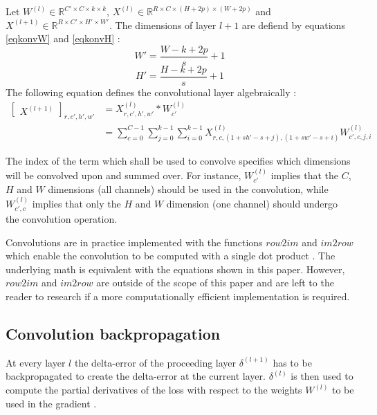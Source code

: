 \documentclass[a4paper, twoside]{article}
\begin{document}
Let $W^{(l)} \in \mathbb{R}^{C' \times C  \times k \times k}$, $X^{(l)} \in \mathbb{R}^{R \times C  \times (H+2p) \times (W+2p)}$ and $X^{(l+1)} \in \mathbb{R}^{R \times C'  \times H' \times W'}$. The dimensions of layer $l+1$ are defiend by equations \eqref{eqkonvW} and \eqref{eqkonvH} \cite{cs231n} \cite{convmath} \cite{convarithmetic}: 
\begin{equation}\label{eqkonvW}
W' = \frac{W-k+2p}{s} +1
\end{equation}
\begin{equation}\label{eqkonvH}
H' = \frac{H-k+2p}{s} +1
\end{equation}
The following equation defines the convolutional layer algebraically \cite{cs231n} \cite{convmath}:
\begin{equation}\label{konvolution}
\begin{split}
	\begin{bmatrix} X^{(l+1)} \end{bmatrix}_{r, c', h', w'}	
		& = X^{(l)}_{r, c', h', w'} *W^{(l)}_{c'} \\
		& = \sum^{C-1 }_{c=0} \sum^{k-1 }_{j=0} \sum^{k-1 }_{i=0} X^{(l)}_{r, c, (1+sh'-s+j), (1+sw'-s+i)}W^{(l)}_{c', c, j, i}
\end{split}
\end{equation}

The index of the term which shall be used to convolve specifies which dimensions will be convolved upon and summed over. For instance, $W^{(l)}_{c'}$ implies that the $C$, $H$ and $W$ dimensions (all channels) should be used in the convolution, while $W^{(l)}_{c', c}$ implies that only the $H$ and $W$ dimension (one channel) should undergo the convolution operation.

Convolutions are in practice implemented with the functions $row2im$ and $im2row$ which enable the convolution to be computed with a single dot product \cite{cs231n} \cite{convmath} \cite{convarithmetic}. The underlying math is equivalent with the equations shown in this paper. However, $row2im$ and $im2row$ are outside of the scope of this paper and are left to the reader to research if a more computationally efficient implementation is required. 

\subsection{Convolution backpropagation}
At every layer $l$ the delta-error of the proceeding layer $\delta^{(l+1)}$ has to be backpropagated to create the delta-error at the current layer. $\delta^{(l)}$ is then used to compute the partial derivatives of the loss with respect to the weights $W^{(l)}$ to be used in the gradient \cite{cs231n} \cite{convmath}. 
 
\end{document}
